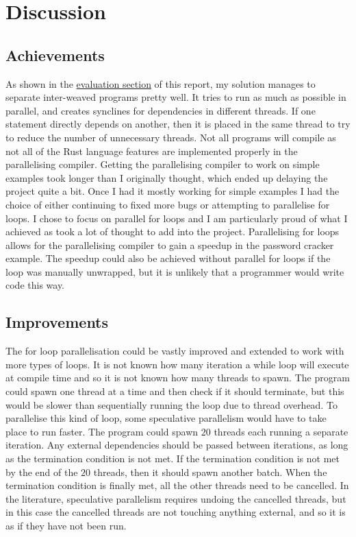 \chapter{Discussion}
\label{sec:discussion}
\section{Achievements}
As shown in the \hyperref[sec:evaluation]{evaluation section} of this report, my solution manages to separate inter-weaved programs pretty well. It tries to run as much as possible in parallel, and creates synclines for dependencies in different threads. If one statement directly depends on another, then it is placed in the same thread to try to reduce the number of unnecessary threads. Not all programs will compile as not all of the Rust language features are implemented properly in the parallelising compiler. Getting the parallelising compiler to work on simple examples took longer than I originally thought, which ended up delaying the project quite a bit. Once I had it mostly working for simple examples I had the choice of either continuing to fixed more bugs or attempting to parallelise for loops. I chose to focus on parallel for loops and I am particularly proud of what I achieved as took a lot of thought to add into the project. Parallelising for loops allows for the parallelising compiler to gain a speedup in the password cracker example. The speedup could also be achieved without parallel for loops if the loop was manually unwrapped, but it is unlikely that a programmer would write code this way.

\section{Improvements}
The for loop parallelisation could be vastly improved and extended to work with more types of loops. It is not known how many iteration a while loop will execute at compile time and so it is not known how many threads to spawn. The program could spawn one thread at a time and then check if it should terminate, but this would be slower than sequentially running the loop due to thread overhead. To parallelise this kind of loop, some speculative parallelism would have to take place to run faster. The program could spawn $20$ threads each running a separate iteration. Any external dependencies should be passed between iterations, as long as the termination condition is not met. If the termination condition is not met by the end of the $20$ threads, then it should spawn another batch. When the termination condition is finally met, all the other threads need to be cancelled. In the literature, speculative parallelism requires undoing the cancelled threads, but in this case the cancelled threads are not touching anything external, and so it is as if they have not been run.

